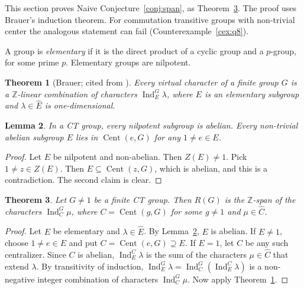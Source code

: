 \documentclass[12pt,letterpaper]{article}
\numberwithin{equation}{section}
\theoremstyle{plain}
\newtheorem{theorem}{Theorem}[section]
\newtheorem{lemma}[theorem]{Lemma}
\theoremstyle{definition}
\newcommand{\Z}{\mathbb{Z}}
\DeclareMathOperator{\Cent}{Cent}
\DeclareMathOperator{\Ind}{Ind}
\begin{document}
This section proves Naive Conjecture~\ref{conj:span}, as
Theorem~\ref{thm:span}. The proof uses Brauer's induction theorem. For
commutation transitive groups with non-trivial center the analogous
statement can fail (Counterexample~\ref{cex:q8}).

A group is \emph{elementary} if it is the direct product of a cyclic group
and a $p$-group, for some prime $p$. Elementary groups are nilpotent.

\begin{theorem}[Brauer; cited from {\cite[Ch.~10]{Se77}}]\label{thm:brauer}
Every virtual character of a finite group $G$ is a $\Z$-linear combination
of characters $\Ind_E^G\lambda$, where $E$ is an elementary subgroup and
$\lambda\in\widehat E$ is one-dimensional.
\end{theorem}

\begin{lemma}\label{lem:nilp}
In a CT group, every nilpotent subgroup is abelian. Every non-trivial
abelian subgroup $E$ lies in $\Cent(e,G)$ for any $1\neq e\in E$.
\end{lemma}

\begin{proof}
Let $E$ be nilpotent and non-abelian. Then $Z(E)\neq1$. Pick $1\neq z\in
Z(E)$. Then $E\subseteq\Cent(z,G)$, which is abelian, and this is a
contradiction. The second claim is clear.
\end{proof}

\begin{theorem}\label{thm:span}
Let $G\neq1$ be a finite CT group. Then $R(G)$ is the $\Z$-span of the
characters $\Ind_C^G\mu$, where $C=\Cent(g,G)$ for some $g\neq1$ and
$\mu\in\widehat C$.
\end{theorem}

\begin{proof}
Let $E$ be elementary and $\lambda\in\widehat E$. By
Lemma~\ref{lem:nilp}, $E$ is abelian. If $E\neq1$, choose $1\neq e\in E$
and put $C=\Cent(e,G)\supseteq E$. If $E=1$, let $C$ be any such
centralizer. Since $C$ is abelian, $\Ind_E^C\lambda$ is the sum of the
characters $\mu\in\widehat C$ that extend $\lambda$. By transitivity of induction,
$\Ind_E^G\lambda=\Ind_C^G(\Ind_E^C\lambda)$ is a non-negative integer
combination of characters $\Ind_C^G\mu$. Now apply
Theorem~\ref{thm:brauer}.
\end{proof}
\end{document}
